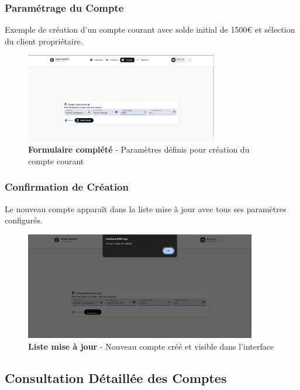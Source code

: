 \documentclass[11pt, a4paper]{article}
\begin{document}
\subsubsection{Paramétrage du Compte}

Exemple de création d'un compte courant avec solde initial de 1500€ et sélection du client propriétaire.

\begin{figure}[H]
    \centering
    \includegraphics[width=0.75\textwidth]{screenshots/05_03_account_form_new_filled.png}
    \caption{\textbf{Formulaire complété} - Paramètres définis pour création du compte courant}
    \label{fig:account_form_new_filled}
\end{figure}

\subsubsection{Confirmation de Création}

Le nouveau compte apparaît dans la liste mise à jour avec tous ses paramètres configurés.

\begin{figure}[H]
    \centering
    \includegraphics[width=0.9\textwidth]{screenshots/05_04_account_list_after_creation.png}
    \caption{\textbf{Liste mise à jour} - Nouveau compte créé et visible dans l'interface}
    \label{fig:account_list_after_creation}
\end{figure}

\subsection{Consultation Détaillée des Comptes}
\end{document}

